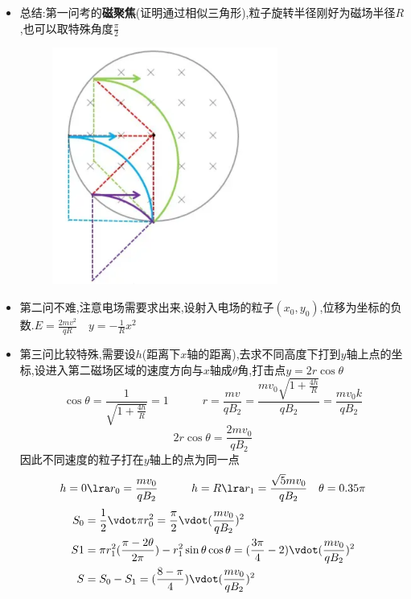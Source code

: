 \documentclass{article}
\begin{document}
\begin{itemize}
    \item 总结:\quad 第一问考的\textbf{磁聚焦}(证明通过相似三角形),粒子旋转半径刚好为磁场半径$R$,也可以取特殊角度$\frac{\pi}{2}$
          \begin{figure}[h]
              \centering
              \includegraphics[width=20em,keepaspectratio]{./pictures/3.1-7.png}
          \end{figure}
    \item 第二问不难,注意电场需要求出来,设射入电场的粒子$(x_{0},y_{0})$,位移为坐标的负数.$E = \frac{2mv^{2}}{qR} \quad y = - \frac{1}{R} x^{2}$
    \item 第三问比较特殊,需要设$h$(距离下$x$轴的距离),去求不同高度下打到$y$轴上点的坐标,设进入第二磁场区域的速度方向与$x$轴成$\theta$角,打击点$ y = 2 r \cos{\theta}$
          $$
              \cos{\theta} = \frac{1}{\sqrt{1 + \frac{4h}{R}}} = 1 \quad \quad \quad r = \frac{mv}{qB_{2}} = \frac{mv_{0} \sqrt{1+\frac{4h}{R}}}{q B_{2}} = \frac{mv_{0} k}{qB_{2}}
          $$
          $$
              2 r \cos{\theta} = \frac{2mv_{0}}{qB_{2}}
          $$
          因此不同速度的粒子打在$y$轴上的点为同一点
          $$
              h = 0 \lra r_{0} = \frac{mv_{0}}{qB_{2}} \quad \quad \quad h = R \lra r_{1} = \frac{\sqrt{5} m v_{0}}{qB_{2}} \quad \theta = 0.35\pi
          $$
          \begin{align*}
              S_{0} & = \frac{1}{2} \vdot \pi r_{0}^{2} = \frac{\pi}{2} \vdot (\frac{mv_{0}}{qB_{2}})^{2}                                                           \\
              S{1}  & = \pi r_{1}^{2} (\frac{\pi - 2\theta}{2 \pi}) - r_{1}^{2} \sin{\theta} \cos{\theta} = (\frac{3\pi}{4} - 2) \vdot (\frac{m v_{0}}{qB_{2}})^{2} \\
              S     & = S_{0} - S_{1} = (\frac{8-\pi}{4}) \vdot (\frac{m v_{0}}{qB_{2}})^{2}
          \end{align*}
\end{itemize}
\end{document}
